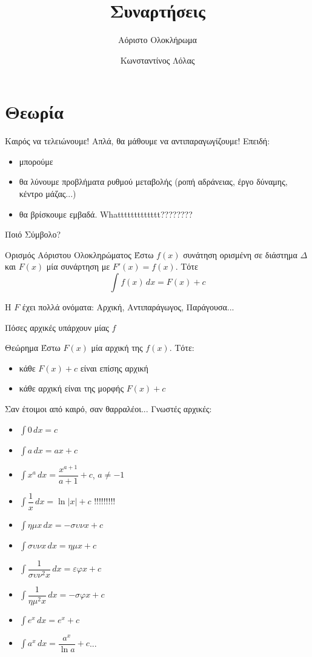 \documentclass{../presentation}
\title{Συναρτήσεις}
\subtitle{Αόριστο Ολοκλήρωμα}
\author[Λόλας]{Κωνσταντίνος Λόλας}
\institute[$10^ο$ ΓΕΛ]{$10^ο$ ΓΕΛ Θεσσαλονίκης}
\begin{document}
\begin{frame}
  \titlepage
\end{frame}

\section{Θεωρία}
\begin{frame}{Καιρός να τελειώνουμε!}
  Απλά, θα μάθουμε να αντιπαραγωγίζουμε! Επειδή:
  \begin{itemize}[<+->]
    \item μπορούμε
    \item θα λύνουμε προβλήματα ρυθμού μεταβολής (ροπή αδράνειας, έργο δύναμης, κέντρο μάζας...)
    \item θα βρίσκουμε εμβαδά. Whattttttttttttt????????
  \end{itemize}
\end{frame}

\begin{frame}{Ποιό Σύμβολο?}
  \begin{block}{Ορισμός Αόριστου Ολοκληρώματος}
    Έστω $f(x)$ συνάτηση ορισμένη σε διάστημα $Δ$ και $F(x)$ μία συνάρτηση με $F'(x)=f(x)$. Τότε
    $$\int f(x) \, dx=F(x)+c$$
  \end{block}
  H $F$ έχει πολλά ονόματα: Αρχική, Αντιπαράγωγος, Παράγουσα...
\end{frame}

\begin{frame}{Πόσες αρχικές υπάρχουν μίας $f$}
  \begin{block}{Θεώρημα}
    Έστω $F(x)$ μία αρχική της $f(x)$. Τότε:
    \begin{itemize}
      \item κάθε $F(x)+c$ είναι επίσης αρχική
      \item κάθε αρχική είναι της μορφής $F(x)+c$
    \end{itemize}
  \end{block}
\end{frame}

\begin{frame}{Σαν έτοιμοι από καιρό, σαν θαρραλέοι...}
  Γνωστές αρχικές:
  \begin{multicols}{2}
    \begin{itemize}[<+->]
      \item $\int 0 \, dx=c$
      \item $\int a \, dx=ax+c$
      \item $\int x^a \, dx=\dfrac{x^{a+1}}{a+1}+c$, $a\ne -1$
      \item $\int \dfrac{1}{x} \, dx=\ln|x|+c$ !!!!!!!!!
      \item $\int ημx \, dx=-συνx+c$
      \item $\int συνx \, dx=ημx+c$
      \item $\int \dfrac{1}{συν^2x} \, dx=εφx+c$
      \item $\int \dfrac{1}{ημ^2x} \, dx=-σφx+c$
      \item $\int e^x \, dx=e^x+c$
      \item $\int a^x \, dx=\dfrac{a^x}{\ln a}+c$...
    \end{itemize}
  \end{multicols}
\end{frame}
\end{document}
